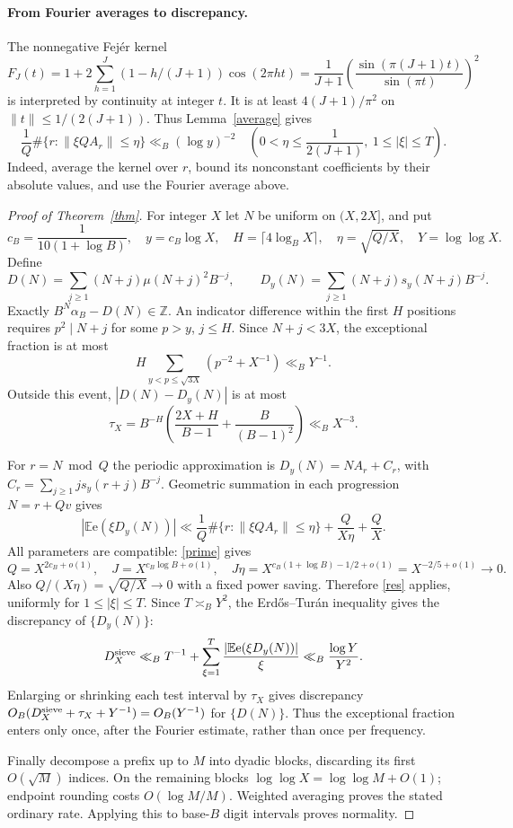 \documentclass[11pt]{article}
\newcommand{\ee}{\mathrm e}
\newcommand{\E}{\mathbb E}
\begin{document}
\paragraph{From Fourier averages to discrepancy.}
The nonnegative Fej\'er kernel
\[
 F_J(t)=1+2\sum_{h=1}^J(1-h/(J+1))\cos(2\pi ht)
       =\frac1{J+1}\left(\frac{\sin(\pi(J+1)t)}{\sin(\pi t)}\right)^2
\]
is interpreted by continuity at integer $t$.
It is at least $4(J+1)/\pi^2$ on $\|t\|\le1/(2(J+1))$.
Thus Lemma~\ref{average} gives
\begin{equation}\label{res}
 \frac1Q\#\{r:\|\xi QA_r\|\le\eta\}\ll_B(\log y)^{-2}
 \quad\left(0<\eta\le\frac1{2(J+1)},\ 1\le|\xi|\le T\right).
\end{equation}
Indeed, average the kernel over $r$, bound its nonconstant coefficients
by their absolute values, and use the Fourier average above.

\begin{proof}[Proof of Theorem~\ref{thm}]
For integer $X$ let $N$ be uniform on $(X,2X]$, and put
\[
 c_B=\frac1{10(1+\log B)},\quad y=c_B\log X,\quad
 H=\lceil4\log_BX\rceil,\quad \eta=\sqrt{Q/X},\quad Y=\log\log X .
\]
Define
\[
 D(N)=\sum_{j\ge1}(N+j)\mu(N+j)^2B^{-j},\qquad
 D_y(N)=\sum_{j\ge1}(N+j)s_y(N+j)B^{-j}.
\]
Exactly $B^N\alpha_B-D(N)\in\mathbb Z$.
An indicator difference within the first $H$ positions requires
$p^2\mid N+j$ for some $p>y$, $j\le H$.
Since $N+j<3X$, the exceptional fraction is at most
\[
 H\sum_{y<p\le\sqrt{3X}}(p^{-2}+X^{-1})\ll_B Y^{-1}.
\]
Outside this event, $|D(N)-D_y(N)|$ is at most
\[
 \tau_X=B^{-H}\left(\frac{2X+H}{B-1}
                          +\frac{B}{(B-1)^2}\right)\ll_B X^{-3}.
\]

For $r=N\bmod Q$ the periodic approximation is
$D_y(N)=NA_r+C_r$, with $C_r=\sum_{j\ge1}j s_y(r+j)B^{-j}$.
Geometric summation in each progression $N=r+Qv$ gives
\[
 |\E\ee(\xi D_y(N))|
 \ll\frac1Q\#\{r:\|\xi QA_r\|\le\eta\}
                       +\frac{Q}{X\eta}+\frac QX .
\]
All parameters are compatible: \eqref{prime} gives
\[
 Q=X^{2c_B+o(1)},\quad J=X^{c_B\log B+o(1)},\quad
 J\eta=X^{c_B(1+\log B)-1/2+o(1)}
                           =X^{-2/5+o(1)}\longrightarrow0.
\]
Also $Q/(X\eta)=\sqrt{Q/X}\to0$ with a fixed power saving.
Therefore \eqref{res} applies, uniformly for $1\le|\xi|\le T$.
Since $T\asymp_B Y^2$, the Erd\H{o}s--Tur\'an inequality \cite{KN}
gives the discrepancy of $\{D_y(N)\}$:
\[
 D_X^{\rm sieve}\ll_B T^{-1}
       +\sum_{\xi=1}^T\frac{|\E\ee(\xi D_y(N))|}{\xi}
                                    \ll_B\frac{\log Y}{Y^2}.
\]
Enlarging or shrinking each test interval by $\tau_X$ gives discrepancy
$O_B(D_X^{\rm sieve}+\tau_X+Y^{-1})=O_B(Y^{-1})$
for $\{D(N)\}$. Thus the exceptional fraction enters only once,
after the Fourier estimate, rather than once per frequency.

Finally decompose a prefix up to $M$ into dyadic blocks, discarding
its first $O(\sqrt M)$ indices. On the remaining blocks
$\log\log X=\log\log M+O(1)$; endpoint rounding costs
$O(\log M/M)$. Weighted averaging proves the stated ordinary rate.
Applying this to base-$B$ digit intervals proves normality.
\end{proof}
\end{document}
